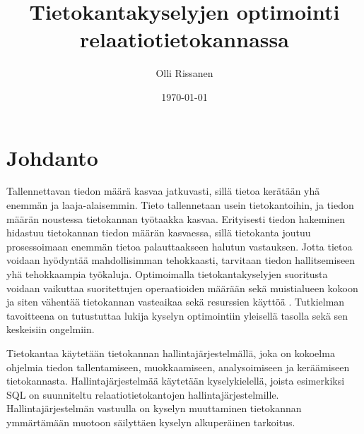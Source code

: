 \documentclass[finnish]{tktltiki2}
\title{Tietokantakyselyjen optimointi relaatiotietokannassa}
\author{Olli Rissanen}
\date{\today}
\theoremstyle{definition}
\theoremstyle{remark}
\begin{document}

\maketitle
\makeabstract
\tableofcontents
\newpage

\setlength{\parskip}{\medskipamount}
\setlength{\parindent}{0pt}



\section{Johdanto}
Tallennettavan tiedon määrä kasvaa jatkuvasti, sillä tietoa kerätään yhä enemmän ja laaja-alaisemmin. %
Tieto tallennetaan usein tietokantoihin, ja tiedon määrän noustessa tietokannan työtaakka kasvaa. Erityisesti tiedon hakeminen hidastuu tietokannan tiedon määrän kasvaessa, sillä tietokanta joutuu prosessoimaan enemmän tietoa palauttaakseen halutun vastauksen. Jotta tietoa voidaan hyödyntää mahdollisimman tehokkaasti, tarvitaan tiedon hallitsemiseen yhä tehokkaampia työkaluja. 
Optimoimalla tietokantakyselyjen suoritusta voidaan vaikuttaa suoritettujen operaatioiden määrään sekä muistialueen kokoon ja siten vähentää tietokannan vasteaikaa sekä resurssien käyttöä \cite{mor2012}. Tutkielman tavoitteena on tutustuttaa lukija kyselyn optimointiin yleisellä tasolla sekä sen keskeisiin ongelmiin. 
	
% 

Tietokantaa käytetään tietokannan hallintajärjestelmällä, joka on kokoelma ohjelmia tiedon tallentamiseen, muokkaamiseen, analysoimiseen ja keräämiseen tietokannasta. Hallintajärjestelmää käytetään kyselykielellä, joista esimerkiksi SQL \cite{5391051} on suunniteltu relaatiotietokantojen hallintajärjestelmille. Hallintajärjestelmän vastuulla on kyselyn muuttaminen tietokannan ymmärtämään muotoon säilyttäen kyselyn alkuperäinen tarkoitus. 
\end{document}
